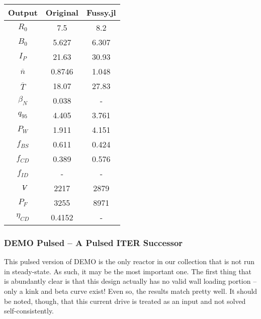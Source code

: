 \begin{table}[h!]
\begin{subtable}[t]{0.5\textwidth}
\begin{tabular}{ c|c|c }
Output           & Original         & Fussy.jl        \\  
\hline
$R_{0}$          & 7.5              & 8.2           \\
$B_{0}$          & 5.627            & 6.307           \\
$I_{P}$          & 21.63            & 30.93           \\
$\overline n$    & 0.8746           & 1.048           \\
$\overline T$    & 18.07            & 27.83           \\
$\beta_{N}$       & 0.038            & -           \\
$q_{95}$         & 4.405            & 3.761           \\
$P_{W}$          & 1.911            & 4.151           \\
$f_{BS}$         & 0.611            & 0.424          \\
$f_{CD}$         & 0.389            & 0.576          \\
$f_{ID}$         & -              & -             \\
$\volume$         & 2217           & 2879          \\
$P_{F}$          & 3255           & 8971          \\
$\eta_{CD}$      & 0.4152           & -          \\

\end{tabular}
\end{subtable}
\hfill
\hfill
\end{table}

\newpage 

\subsubsection{DEMO Pulsed -- A Pulsed ITER Successor}

This pulsed version of DEMO is the only reactor in our collection that is not run in steady-state. As such, it may be the most important one. The first thing that is abundantly clear is that this design actually has no valid wall loading portion -- only a kink and beta curve exist! Even so, the results match pretty well. It should be noted, though, that this current drive is treated as an input and not solved self-consistently.

